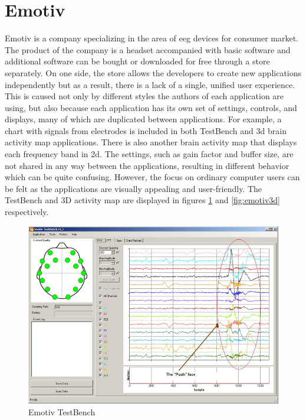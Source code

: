 \section{Emotiv}
Emotiv is a company specializing in the area of \gls{eeg} devices for consumer market.
The product of the company is a headset accompanied with basic software and additional software can be bought or downloaded for free through a store
separately. On one side, the store allows the developers to create new
applications independently but as a result, there is a lack of a single, unified
user experience. This is caused not only by different styles the authors of each
application are using, but also because each application has its own set of
settings, controls, and displays, many of which are duplicated between
applications. For example, a chart with signals from electrodes is included in
both TestBench and \gls{3d} brain activity map applications. There is also another
brain activity map that displays each frequency band in \gls{2d}. The settings,
such as gain factor and buffer size, are not shared in any way between the
applications, resulting in different behavior which can be quite confusing.
However, the focus on ordinary computer users can be felt as the applications
are visually appealing and user-friendly. The TestBench and 3D activity map are displayed in figures \ref{fig:emotivTest} and \ref{fig:emotiv3d} respectively. 

\begin{figure}[htbp]
	\centering
	\includegraphics[width=0.8\linewidth]{fig/emotivTest.jpg}
	\caption[Caption for LOF]{Emotiv TestBench\protect\footnotemark}
	\label{fig:emotivTest}
\end{figure}

